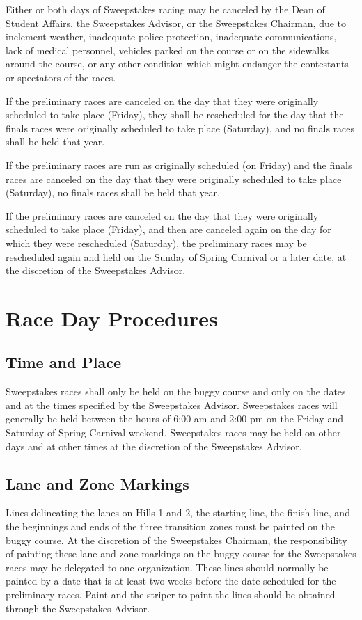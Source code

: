 	Either or both days of Sweepstakes racing may be canceled by the Dean of
	Student Affairs, the Sweepstakes Advisor, or the Sweepstakes Chairman, due to
	inclement weather, inadequate police protection, inadequate communications,
	lack of medical personnel, vehicles parked on the course or on the sidewalks
	around the course, or any other condition which might endanger the contestants
	or spectators of the races.

	If the preliminary races are canceled on the day that they were originally
	scheduled to take place (Friday), they shall be rescheduled for the day that
	the finals races were originally scheduled to take place (Saturday), and no
	finals races shall be held that year.

	If the preliminary races are run as originally scheduled (on Friday) and the
	finals races are canceled on the day that they were originally scheduled to
	take place (Saturday), no finals races shall be held that year.

	If the preliminary races are canceled on the day that they were originally
	scheduled to take place (Friday), and then are canceled again on the day for
	which they were rescheduled (Saturday), the preliminary races may be
	rescheduled again and held on the Sunday of Spring Carnival or a later date, at
	the discretion of the Sweepstakes Advisor.

\section{Race Day Procedures}

\subsection{Time and Place}

	Sweepstakes races shall only be held on the buggy course and only on the dates
	and at the times specified by the Sweepstakes Advisor. Sweepstakes races will
	generally be held between the hours of 6:00 am and 2:00 pm on the Friday and
	Saturday of Spring Carnival weekend. Sweepstakes races may be held on other
	days and at other times at the discretion of the Sweepstakes Advisor.

\subsection{Lane and Zone Markings}

	Lines delineating the lanes on Hills 1 and 2, the starting line, the finish
	line, and the beginnings and ends of the three transition zones must be painted
	on the buggy course. At the discretion of the Sweepstakes Chairman, the
	responsibility of painting these lane and zone markings on the buggy course for
	the Sweepstakes races may be delegated to one organization. These lines should
	normally be painted by a date that is at least two weeks before the date
	scheduled for the preliminary races. Paint and the striper to paint the lines
	should be obtained through the Sweepstakes Advisor.

